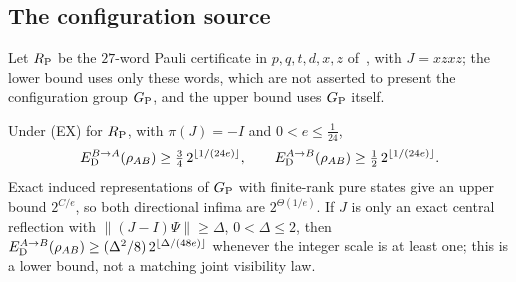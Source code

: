 \subsection{The configuration source}\label{sec:exact-config}

Let $R_{\mathrm P}$ be the $27$-word Pauli certificate in $p,q,t,d,x,z$ of~\cite[Definition~7.1]{DM-game}, with $J=xzxz$; the lower bound uses
only these words, which are not asserted to present the configuration group $G_{\mathrm P}$, and the upper bound uses $G_{\mathrm P}$ itself.

\begin{theorem}\label{thm:exact-config}
Under (EX) for $R_{\mathrm P}$, with $\pi(J)=-I$ and $0<e\le\frac1{24}$,
\[
E_{\mathrm D}^{B\to A}(\rho_{AB})\ge\tfrac34\,2^{\lfloor1/(24e)\rfloor},\qquad E_{\mathrm D}^{A\to B}(\rho_{AB})\ge\tfrac12\,2^{\lfloor1/(24e)\rfloor}.
\]
Exact induced representations of $G_{\mathrm P}$ with finite-rank pure states give an upper bound $2^{C/e}$, so both directional infima
are $2^{\Theta(1/e)}$. If $J$ is only an exact central reflection with $\|(J-I)\Psi\|\ge\Delta$, $0<\Delta\le2$, then
$E_{\mathrm D}^{A\to B}(\rho_{AB})\ge(\Delta^2/8)\,2^{\lfloor\Delta/(48e)\rfloor}$ whenever the integer scale is at least one; this is a lower bound, not a
matching joint visibility law.
\end{theorem}

